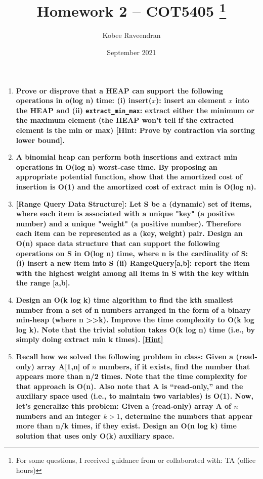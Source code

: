 \documentclass[12pt]{article}
\title{Homework 2 -- COT5405
    \thanks{For some questions, I received guidance from or collaborated with: TA (office hours)}
}
\author{Kobee Raveendran}
\date{September 2021}
\begin{document}
\maketitle

\begin{enumerate}
    \item \textbf{Prove or disprove that a HEAP can support the following operations in o(log n) time: 
    (i) insert($x$): insert an element $x$ into the HEAP and (ii) \texttt{extract\_min\_max}: extract either 
    the minimum or the maximum element (the HEAP won't tell if the extracted element is the min 
    or max) [Hint: Prove by contraction via sorting lower bound].}
    \item \textbf{A binomial heap can perform both insertions and extract min operations in O(log n) 
    worst-case time. By proposing an appropriate potential function, show that the amortized 
    cost of insertion is O(1) and the amortized cost of extract min is O(log n).}
    \item \textbf{[Range Query Data Structure]: Let S be a (dynamic) set of items, where each item is 
    associated with a unique "key" (a positive number) and a unique "weight" (a positive 
    number). Therefore each item can be represented as a (key, weight) pair. Design an O(n) 
    space data structure that can support the following operations on S in O(log n) time, where 
    n is the cardinality of S: (i) insert a new item into S (ii) RangeQuery[a,b]: report the 
    item with the highest weight among all items in S with the key within the range [a,b].}
    \item \textbf{Design an O(k log k) time algorithm to find the kth smallest number from a set 
    of n numbers arranged in the form of a binary min-heap (where n >>k). Improve the time 
    complexity to O(k log log k). Note that the trivial solution takes O(k log n) time (i.e., 
    by simply doing extract min k times).}
    \href{http://160592857366.free.fr/joe/ebooks/ShareData/An%20Optimal%20Algorithm%20for%20Selection%20in%20a%20Min-Heap.pdf}{\textbf{[Hint]}}

    \item \textbf{Recall how we solved the following problem in class: Given a (read-only) 
    array A[1,n] of $n$ numbers, if it exists, find the number that appears more than n/2 
    times. Note that the time complexity for that approach is O(n). Also 
    note that A is ``read-only,'' and the auxiliary space used (i.e., to maintain two variables) 
    is O(1). Now, let's generalize this problem: Given a (read-only) array A of $n$ numbers and 
    an integer $k > 1$, determine the numbers that appear more than n/k times, if they exist. 
    Design an O(n log k) time solution that uses only O(k) auxiliary space.}


\end{enumerate}
\end{document}
